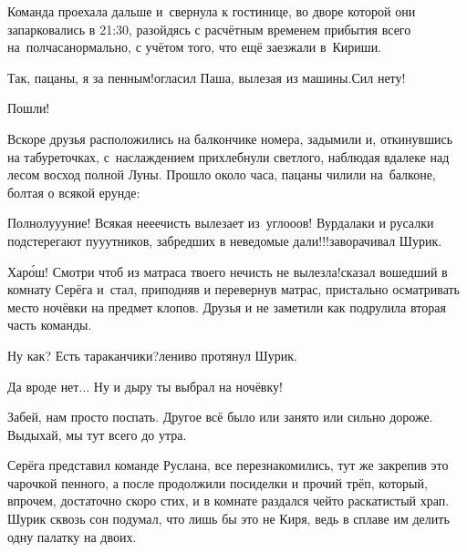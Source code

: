 Команда проехала дальше и~свернула к гостинице, во дворе которой они запарковались в 21:30, разойдясь с расчётным временем прибытия всего на~полчаса\mdash нормально, с учётом того, что ещё заезжали в~Кириши.

\diagdash Так, пацаны, я за пенным!\mdash огласил Паша, вылезая из машины.\mdash Сил нету!

\diagdash Пошли!

Вскоре друзья расположились на балкончике номера, задымили и, откинувшись на табуреточках, с~наслаждением прихлебнули светлого, наблюдая вдалеке над лесом восход полной Луны. Прошло около часа, пацаны чилили на~балконе, болтая о всякой ерунде:

\diagdash Полнолу\sdash у\sdash уние! Всякая не\sdash е\sdash ечисть вылезает из~угло\sdash о\sdash ов! Вурдалаки и русалки подстерегают пу\sdash у\sdash утников, забредших в неведомые дали!!!\mdash заворачивал Шурик.

\diagdash Хар\'{о}ш! Смотри чтоб из матраса твоего нечисть не вылезла!\mdash сказал вошедший в комнату Серёга и~стал, приподняв и перевернув матрас, пристально осматривать место ночёвки на предмет клопов. Друзья и не заметили как подрулила вторая часть команды.

\diagdash Ну как? Есть тараканчики?\mdash лениво протянул Шурик.

\diagdash Да вроде нет$\ldots$ Ну и дыру ты выбрал на ночёвку! 

\diagdash Забей, нам просто поспать. Другое всё было или занято или сильно дороже. Выдыхай, мы тут всего до утра.

Серёга представил команде Руслана, все перезнакомились, тут же закрепив это чарочкой пенного, а после продолжили посиделки и прочий трёп, который, впрочем, достаточно скоро стих, и в комнате раздался чей\sdash то раскатистый храп. Шурик сквозь сон подумал, что лишь бы это не Киря, ведь в сплаве им делить одну палатку на двоих.

\begin{center}
\end{center}